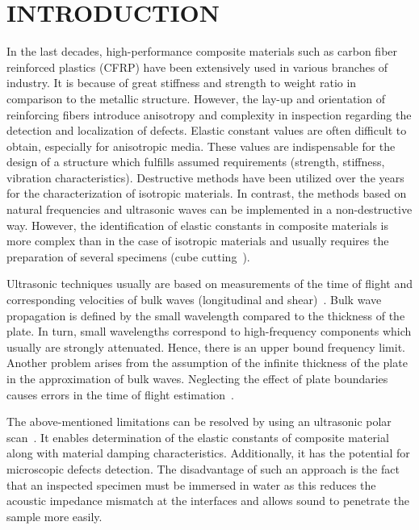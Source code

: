 \documentclass[]{spie}  %
\begin{document}
\section{INTRODUCTION}
\label{sec:intro}  %
In the last decades, high-performance composite materials such as carbon fiber reinforced plastics (CFRP) have been extensively used in various branches of industry.
It is because of great stiffness and strength to weight ratio in comparison to the metallic structure. 
However, the lay-up and orientation of reinforcing fibers introduce anisotropy and complexity in inspection regarding the detection and localization of defects.
Elastic constant values are often difficult to obtain, especially for anisotropic media.
These values are indispensable for the design of a structure which fulfills assumed 
requirements (strength, stiffness, vibration characteristics). 
Destructive methods have been utilized over the years for the characterization of isotropic materials. 
In contrast, the methods based on natural frequencies and ultrasonic waves can be implemented in a non-destructive way. 
However, the identification of elastic constants in composite materials is more complex than in the case of isotropic materials and usually requires the preparation of several specimens (cube cutting~\cite{Ditri1993}).

Ultrasonic techniques usually are based on measurements of the time of flight and corresponding velocities of bulk waves (longitudinal and shear)~\cite{Castellano2014}.
Bulk wave propagation is defined by the small wavelength compared to the thickness of the plate. 
In turn, small wavelengths correspond to high-frequency components which usually are strongly attenuated. 
Hence, there is an upper bound frequency limit.
Another problem arises from the assumption of the infinite thickness of the plate in the approximation of bulk waves. 
Neglecting the effect of plate boundaries causes errors in the time of flight estimation~\cite{Martens2017}. 

The above-mentioned limitations can be resolved by using an ultrasonic polar scan~\cite{Martens2019a}.
It enables determination of the elastic constants of composite material along with material damping characteristics.
Additionally, it has the potential for microscopic defects detection.
The disadvantage of such an approach is the fact that an inspected specimen must be immersed in water as this reduces the acoustic impedance mismatch at the
interfaces and allows sound to penetrate the sample more easily.
\end{document}
